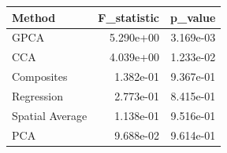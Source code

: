 \begin{tabular}{lrr}
\toprule
Method & F_statistic & p_value \\
\midrule
GPCA & 5.290e+00 & 3.169e-03 \\
CCA & 4.039e+00 & 1.233e-02 \\
Composites & 1.382e-01 & 9.367e-01 \\
Regression & 2.773e-01 & 8.415e-01 \\
Spatial Average & 1.138e-01 & 9.516e-01 \\
PCA & 9.688e-02 & 9.614e-01 \\
\bottomrule
\end{tabular}
